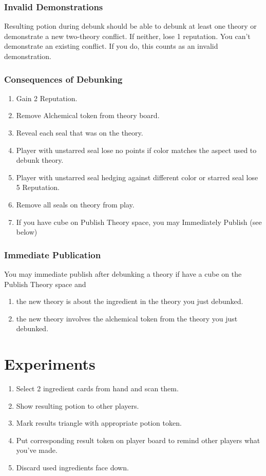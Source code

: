\documentclass[12pt]{article}
\newenvironment{enumerateCustom}
{\begin{enumerate}
  \setlength{\itemsep}{1pt}
  \setlength{\parskip}{0pt}
  \setlength{\parsep}{0pt}}
{\end{enumerate}}
\begin{document}
\begin{multicols*}{2}
\subsubsection*{Invalid Demonstrations}
Resulting potion during debunk should be able to debunk at least one theory or demonstrate a new two-theory conflict. If neither, lose 1 reputation. You can't demonstrate an existing conflict. If you do, this counts as an invalid demonstration.

\subsubsection*{Consequences of Debunking}
\begin{enumerateCustom}
    \item Gain 2 Reputation.
    \item Remove Alchemical token from theory board.
    \item Reveal each seal that was on the theory.
    \item Player with unstarred seal lose no points if color matches the aspect used to debunk theory.
    \item Player with unstarred seal hedging against different color or starred seal lose 5 Reputation.
    \item Remove all seals on theory from play.
    \item If you have cube on Publish Theory space, you may Immediately Publish (see below)
\end{enumerateCustom}

\subsubsection*{Immediate Publication}
You may immediate publish after debunking a theory if have a cube on the Publish Theory space and
\begin{enumerateCustom}
    \item the new theory is about the ingredient in the theory you just debunked.
    \item the new theory involves the alchemical token from the theory you just debunked.
\end{enumerateCustom}

\section*{Experiments}
\begin{enumerateCustom}
    \item Select 2 ingredient cards from hand and scan them.
    \item Show resulting potion to other players.
    \item Mark results triangle with appropriate potion token.
    \item Put corresponding result token on player board to remind other players what you've made.
    \item Discard used ingredients face down.
\end{enumerateCustom}


\end{multicols*}
\end{document}
